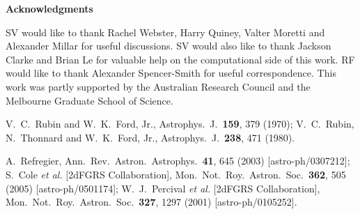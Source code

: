 \documentclass[12pt]{article}
\begin{document}
{{\begin{flushleft}

{\Large \bf Acknowledgments}

\end{flushleft}

\vskip 0.2cm
\noindent
SV would like to thank Rachel Webster, Harry Quiney, Valter Moretti and
Alexander Millar for useful discussions. SV would also like to thank
Jackson Clarke and Brian Le for valuable help on the computational side
of this work. RF would like to thank Alexander Spencer-Smith
for useful correspondence. This work was partly supported by the
Australian Research Council and the Melbourne Graduate School of
Science.


\begin{thebibliography}{999}

  V.~C.~Rubin and W.~K.~Ford, Jr.,
  Astrophys.\ J.\  {\bf 159}, 379 (1970);
  V.~C.~Rubin, N.~Thonnard and W.~K.~Ford, Jr.,
Astrophys.\ J.\  {\bf 238}, 471 (1980).
  
  A.~Refregier,
  Ann.\ Rev.\ Astron.\ Astrophys.\  {\bf 41}, 645 (2003)
  [astro-ph/0307212];
  S.~Cole {\it et al.}  [2dFGRS Collaboration],
  Mon.\ Not.\ Roy.\ Astron.\ Soc.\  {\bf 362}, 505 (2005)
[astro-ph/0501174];
W.~J.~Percival {\it et al.}  [2dFGRS Collaboration],
 Mon.\ Not.\ Roy.\ Astron.\ Soc.\  {\bf 327}, 1297 (2001)
[astro-ph/0105252].




\end{thebibliography}}}
\end{document}
